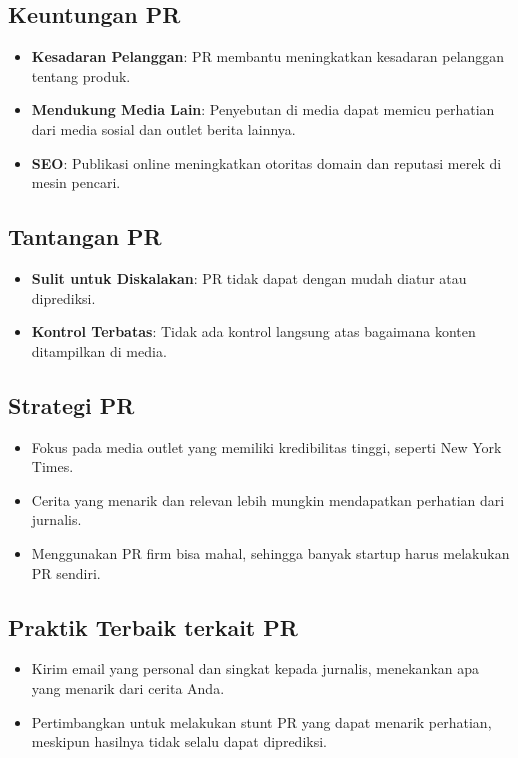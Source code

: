 \documentclass{article}
\begin{document}
\subsection{Keuntungan PR}
\begin{itemize}
    \item \textbf{Kesadaran Pelanggan}: PR membantu meningkatkan kesadaran pelanggan tentang produk.
    \item \textbf{Mendukung Media Lain}: Penyebutan di media dapat memicu perhatian dari media sosial dan outlet berita lainnya.
    \item \textbf{SEO}: Publikasi online meningkatkan otoritas domain dan reputasi merek di mesin pencari.
\end{itemize}

\subsection{Tantangan PR}
\begin{itemize}
    \item \textbf{Sulit untuk Diskalakan}: PR tidak dapat dengan mudah diatur atau diprediksi.
    \item \textbf{Kontrol Terbatas}: Tidak ada kontrol langsung atas bagaimana konten ditampilkan di media.
\end{itemize}

\subsection{Strategi PR}
\begin{itemize}
    \item Fokus pada media outlet yang memiliki kredibilitas tinggi, seperti New York Times.
    \item Cerita yang menarik dan relevan lebih mungkin mendapatkan perhatian dari jurnalis.
    \item Menggunakan PR firm bisa mahal, sehingga banyak startup harus melakukan PR sendiri.
\end{itemize}

\subsection{Praktik Terbaik terkait PR}
\begin{itemize}
    \item Kirim email yang personal dan singkat kepada jurnalis, menekankan apa yang menarik dari cerita Anda.
    \item Pertimbangkan untuk melakukan stunt PR yang dapat menarik perhatian, meskipun hasilnya tidak selalu dapat diprediksi.
\end{itemize}
\end{document}
